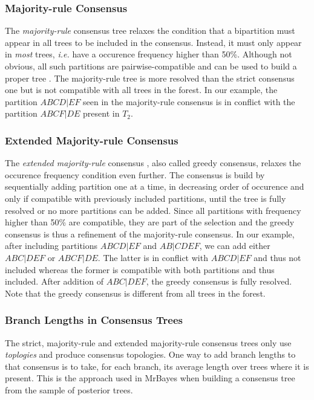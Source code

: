 \subsubsection{Majority-rule Consensus}

The \emph{majority-rule} consensus tree \citep{Margush1981} relaxes the condition that a bipartition must appear in all trees to be included in the consensus. Instead, it must only appear in \emph{most} trees, \emph{i.e.} have a occurence frequency higher than 50\%. Although not obvious, all such partitions are pairwise-compatible and can be used to build a proper tree \citep{Buneman1971}. The majority-rule tree is more resolved than the strict consensus one but is not compatible with all trees in the forest. In our example, the partition $ABCD|EF$ seen in the majority-rule consensus is in conflict with the partition $ABCF|DE$ present in $T_2$. 

\subsubsection{Extended Majority-rule Consensus}

The \emph{extended majority-rule} consensus \citep{Felsenstein2005}, also called greedy consensus, relaxes the occurence frequency condition even further. The consensus is build by sequentially adding partition one at a time, in decreasing order of occurence and only if compatible with previously included partitions, until the tree is fully resolved or no more partitions can be added. Since all partitions with frequency higher than 50\% are compatible, they are part of the selection and the greedy consensus is thus a refinement of the majority-rule consensus. In our example, after including partitions $ABCD|EF$ and $AB|CDEF$, we can add either $ABC|DEF$ or $ABCF|DE$. The latter is in conflict with $ABCD|EF$ and thus not included whereas the former is compatible with both partitions and thus included. After addition of $ABC|DEF$, the greedy consensus is fully resolved. Note that the greedy consensus is different from all trees in the forest. 

\subsubsection{Branch Lengths in Consensus Trees}

The strict, majority-rule and extended majority-rule consensus trees only use \emph{toplogies} and produce consensus topologies. One way to add branch lengths to that consensus is to take, for each branch, its average length over trees where it is present. This is the approach used in MrBayes \citep{Ronquist2003} when building a consensus tree from the sample of posterior trees. 

